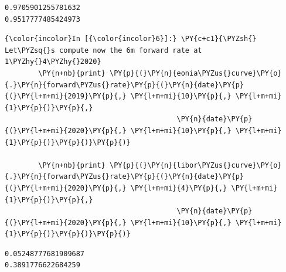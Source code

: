     \begin{Verbatim}[commandchars=\\\{\}]
0.9705901255781632
0.9517777485424973

    \end{Verbatim}

    \begin{Verbatim}[commandchars=\\\{\}]
{\color{incolor}In [{\color{incolor}6}]:} \PY{c+c1}{\PYZsh{} Let\PYZsq{}s compute now the 6m forward rate at 1\PYZhy{}4\PYZhy{}2020}
        \PY{n+nb}{print} \PY{p}{(}\PY{n}{eonia\PYZus{}curve}\PY{o}{.}\PY{n}{forward\PYZus{}rate}\PY{p}{(}\PY{n}{date}\PY{p}{(}\PY{l+m+mi}{2019}\PY{p}{,} \PY{l+m+mi}{10}\PY{p}{,} \PY{l+m+mi}{1}\PY{p}{)}\PY{p}{,} 
                                         \PY{n}{date}\PY{p}{(}\PY{l+m+mi}{2020}\PY{p}{,} \PY{l+m+mi}{10}\PY{p}{,} \PY{l+m+mi}{1}\PY{p}{)}\PY{p}{)}\PY{p}{)}
        
        \PY{n+nb}{print} \PY{p}{(}\PY{n}{libor\PYZus{}curve}\PY{o}{.}\PY{n}{forward\PYZus{}rate}\PY{p}{(}\PY{n}{date}\PY{p}{(}\PY{l+m+mi}{2020}\PY{p}{,} \PY{l+m+mi}{4}\PY{p}{,} \PY{l+m+mi}{1}\PY{p}{)}\PY{p}{,} 
                                         \PY{n}{date}\PY{p}{(}\PY{l+m+mi}{2020}\PY{p}{,} \PY{l+m+mi}{10}\PY{p}{,} \PY{l+m+mi}{1}\PY{p}{)}\PY{p}{)}\PY{p}{)}
\end{Verbatim}

    \begin{Verbatim}[commandchars=\\\{\}]
0.05248777681909687
0.3891776622684259

    \end{Verbatim}

